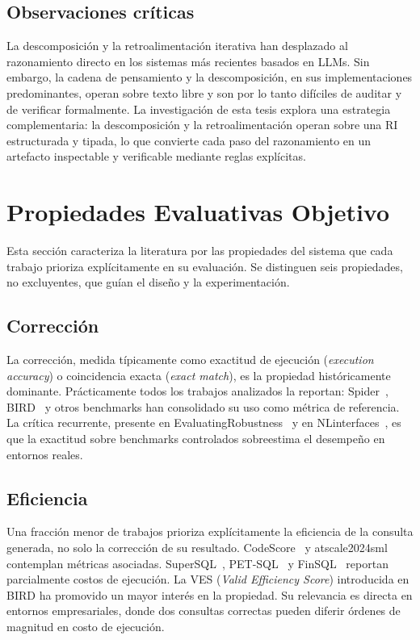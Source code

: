 \subsection{Observaciones críticas}
\label{subsec:sota-d5-obs}

La descomposición y la retroalimentación iterativa han desplazado al
razonamiento directo en los sistemas más recientes basados en
\acp{LLM}. Sin embargo, la cadena de pensamiento y la descomposición,
en sus implementaciones predominantes, operan sobre texto libre y son
por lo tanto difíciles de auditar y de verificar formalmente. La
investigación de esta tesis explora una estrategia complementaria: la
descomposición y la retroalimentación operan sobre una RI estructurada
y tipada, lo que convierte cada paso del razonamiento en un artefacto
inspectable y verificable mediante reglas explícitas.

\section{Propiedades Evaluativas Objetivo}
\label{sec:sota-d6-propiedades}

Esta sección caracteriza la literatura por las propiedades del sistema
que cada trabajo prioriza explícitamente en su evaluación. Se distinguen
seis propiedades, no excluyentes, que guían el diseño y la
experimentación.

\subsection{Corrección}
\label{subsec:sota-d6-correccion}

La corrección, medida típicamente como exactitud de ejecución
(\emph{execution accuracy}) o coincidencia exacta (\emph{exact match}),
es la propiedad históricamente dominante. Prácticamente todos los
trabajos analizados la reportan: Spider~\cite{spider2_2025},
BIRD~\cite{BIRD2023} y otros benchmarks han consolidado su uso como
métrica de referencia.
La crítica recurrente, presente en
EvaluatingRobustness~\cite{EvaluatingRobustness} y en
NLinterfaces~\cite{NLinterfaces}, es que la exactitud sobre benchmarks
controlados sobreestima el desempeño en entornos reales.

\subsection{Eficiencia}
\label{subsec:sota-d6-eficiencia}

Una fracción menor de trabajos prioriza explícitamente la eficiencia de
la consulta generada, no solo la corrección de su resultado.
CodeScore~\cite{CodeScore} y atscale2024sml~\cite{atscale2024sml}
contemplan métricas asociadas. SuperSQL~\cite{SuperSQL2024},
PET-SQL~\cite{PET-SQL2024} y FinSQL~\cite{FinSQL2024} reportan
parcialmente costos de ejecución. La VES (\emph{Valid Efficiency Score})
introducida en BIRD ha promovido un mayor interés en la propiedad. Su
relevancia es directa en entornos empresariales, donde dos consultas
correctas pueden diferir órdenes de magnitud en costo de ejecución.

